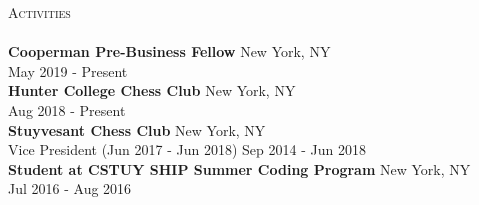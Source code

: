 \documentclass[a4paper]{article}
\newcommand{\lineunder} {
    \vspace*{-8pt} \\
    \hspace*{-18pt} \hrulefill \\
}
\newcommand{\header} [1] {
    {\hspace*{-18pt}\vspace*{6pt} \textsc{#1}}
    \vspace*{-6pt} \lineunder
}
\begin{document}
\header{Activities}
\textbf{Cooperman Pre-Business Fellow} \hfill New York, NY\\
\hfill May 2019 - Present\\
\vspace*{2mm}
\textbf{Hunter College Chess Club} \hfill New York, NY\\
\hfill Aug 2018 - Present\\
\vspace*{2mm}
\textbf{Stuyvesant Chess Club} \hfill New York, NY\\
Vice President (Jun 2017 - Jun 2018) \vspace{2mm} \hfill Sep 2014 - Jun 2018\\
\vspace*{2mm}
\textbf{Student at CSTUY SHIP Summer Coding Program} \hfill New York, NY\\
\hfill Jul 2016 - Aug 2016\\
\vspace*{2mm}
\
\end{document}
